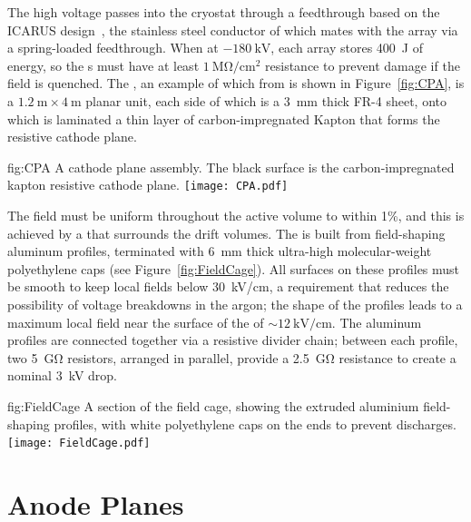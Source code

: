 The high voltage passes into the cryostat through a feedthrough based on the ICARUS design~\cite{Icarus-T600}, the stainless steel conductor of which mates with the  array via a spring-loaded feedthrough.
When at $-\SI{180}{\kilo\volt}$, each  array stores \SI{400}{\joule} of energy, so the s must have at least $\SI{1}{\mega\ohm/\cm^{2}}$ resistance to prevent damage if the field is quenched. The , an example of which from  is shown in Figure~\ref{fig:CPA}, is a $\SI{1.2}{\meter}\times\SI{4}{\meter}$ planar unit, each side of which is a \SI{3}{\mm} thick FR-4 sheet, onto which is laminated a thin layer of carbon-impregnated Kapton that forms the resistive cathode plane.

\begin{dunefigure}{fig:CPA}
{A   cathode plane assembly. The black surface is the carbon-impregnated kapton resistive cathode plane.}
\texttt{[image: CPA.pdf]}
\end{dunefigure}

The field must be uniform throughout the active  volume to within 1\%, and this is achieved by a  that surrounds the drift volumes. The  is built from field-shaping aluminum profiles, terminated with \SI{6}{\mm} thick ultra-high molecular-weight polyethylene caps (see Figure~\ref{fig:FieldCage}). All surfaces on these profiles must be smooth to keep local fields below \SI{30}{\kilo\volt/\cm}, a requirement that reduces the possibility of voltage breakdowns in the argon; the shape of the profiles leads to a maximum local field near the surface of the  of $\sim\!\SI{12}{\kilo\volt/\cm}$. The aluminum profiles are connected together via a resistive divider chain; between each profile, two \SI{5}{\giga\ohm} resistors, arranged in parallel, provide a \SI{2.5}{\giga\ohm} resistance to create a nominal \SI{3}{\kilo\volt} drop.

\begin{dunefigure}{fig:FieldCage}
{A section of the field cage, showing the extruded aluminium field-shaping profiles, with white polyethylene caps on the ends to prevent discharges.}
\texttt{[image: FieldCage.pdf]}
\end{dunefigure}

\section{Anode Planes}
\label{sec:fdsp-exec-apas}

